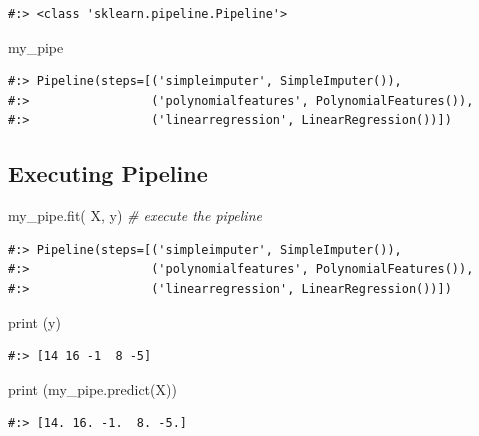 \documentclass[
]{book}
\newenvironment{Shaded}{\begin{snugshade}}{\end{snugshade}}
\newcommand{\BuiltInTok}[1]{#1}
\newcommand{\CommentTok}[1]{\textcolor[rgb]{0.37,0.37,0.37}{\textit{#1}}}
\newcommand{\NormalTok}[1]{#1}
\begin{document}
\begin{verbatim}
#:> <class 'sklearn.pipeline.Pipeline'>
\end{verbatim}

\begin{Shaded}
\begin{Highlighting}[]
\NormalTok{my_pipe}
\end{Highlighting}
\end{Shaded}

\begin{verbatim}
#:> Pipeline(steps=[('simpleimputer', SimpleImputer()),
#:>                 ('polynomialfeatures', PolynomialFeatures()),
#:>                 ('linearregression', LinearRegression())])
\end{verbatim}

\hypertarget{executing-pipeline}{%
\subsection{Executing Pipeline}\label{executing-pipeline}}

\begin{Shaded}
\begin{Highlighting}[]
\NormalTok{my_pipe.fit( X, y) }\CommentTok{# execute the pipeline}
\end{Highlighting}
\end{Shaded}

\begin{verbatim}
#:> Pipeline(steps=[('simpleimputer', SimpleImputer()),
#:>                 ('polynomialfeatures', PolynomialFeatures()),
#:>                 ('linearregression', LinearRegression())])
\end{verbatim}

\begin{Shaded}
\begin{Highlighting}[]
\BuiltInTok{print}\NormalTok{ (y)}
\end{Highlighting}
\end{Shaded}

\begin{verbatim}
#:> [14 16 -1  8 -5]
\end{verbatim}

\begin{Shaded}
\begin{Highlighting}[]
\BuiltInTok{print}\NormalTok{ (my_pipe.predict(X))}
\end{Highlighting}
\end{Shaded}

\begin{verbatim}
#:> [14. 16. -1.  8. -5.]
\end{verbatim}
\end{document}
